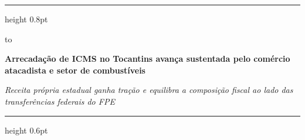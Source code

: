 \documentclass[10pt,a4paper]{article}
\begin{document}
\color{cinzatexto}

%
\par\vspace{2pt}%
{\color{douradoto}\hrule height 0.8pt}%
\par\vspace{6pt}%
\noindent\hbox to %
\par\vspace{5pt}%
{\fontsize{14.5}{17.4}\selectfont\bfseries\color{corprimaria}Arrecadação de ICMS no Tocantins avança sustentada pelo comércio atacadista e setor de combustíveis\par}%
\vspace{3pt}%
{\footnotesize\itshape\color{cinzasub}Receita própria estadual ganha tração e equilibra a composição fiscal ao lado das transferências federais do FPE\par}%
\par\vspace{6pt}%
{\color{cinzaborda}\hrule height 0.6pt}%

\vspace{0.14cm}
\end{document}
